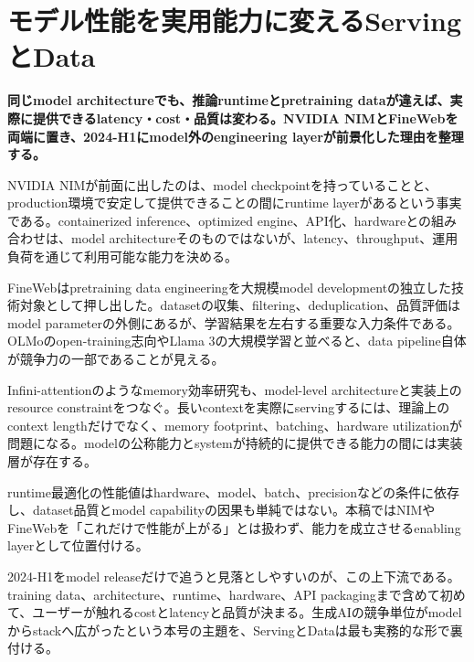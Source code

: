 \section{モデル性能を実用能力に変えるServingとData}
\noindent\textbf{同じmodel architectureでも、推論runtimeとpretraining dataが違えば、実際に提供できるlatency・cost・品質は変わる。NVIDIA NIMとFineWebを両端に置き、2024-H1にmodel外のengineering layerが前景化した理由を整理する。}\autocite{src-054d1f81750b,src-51631a225b70}

NVIDIA NIMが前面に出したのは、model checkpointを持っていることと、production環境で安定して提供できることの間にruntime layerがあるという事実である。containerized inference、optimized engine、API化、hardwareとの組み合わせは、model architectureそのものではないが、latency、throughput、運用負荷を通じて利用可能な能力を決める。\autocite{src-054d1f81750b}


FineWebはpretraining data engineeringを大規模model developmentの独立した技術対象として押し出した。datasetの収集、filtering、deduplication、品質評価はmodel parameterの外側にあるが、学習結果を左右する重要な入力条件である。OLMoのopen-training志向やLlama 3の大規模学習と並べると、data pipeline自体が競争力の一部であることが見える。\autocite{src-3d2fa83e273d,src-51631a225b70,src-f9616f30e8f5}


Infini-attentionのようなmemory効率研究も、model-level architectureと実装上のresource constraintをつなぐ。長いcontextを実際にservingするには、理論上のcontext lengthだけでなく、memory footprint、batching、hardware utilizationが問題になる。modelの公称能力とsystemが持続的に提供できる能力の間には実装層が存在する。\autocite{src-054d1f81750b,src-2eb2353f0533}


\begin{claimboundary}
runtime最適化の性能値はhardware、model、batch、precisionなどの条件に依存し、dataset品質とmodel capabilityの因果も単純ではない。本稿ではNIMやFineWebを「これだけで性能が上がる」とは扱わず、能力を成立させるenabling layerとして位置付ける。\autocite{src-054d1f81750b,src-51631a225b70}
\end{claimboundary}

2024-H1をmodel releaseだけで追うと見落としやすいのが、この上下流である。training data、architecture、runtime、hardware、API packagingまで含めて初めて、ユーザーが触れるcostとlatencyと品質が決まる。生成AIの競争単位がmodelからstackへ広がったという本号の主題を、ServingとDataは最も実務的な形で裏付ける。\autocite{src-054d1f81750b,src-2eb2353f0533,src-3d2fa83e273d,src-51631a225b70,src-f9616f30e8f5}
